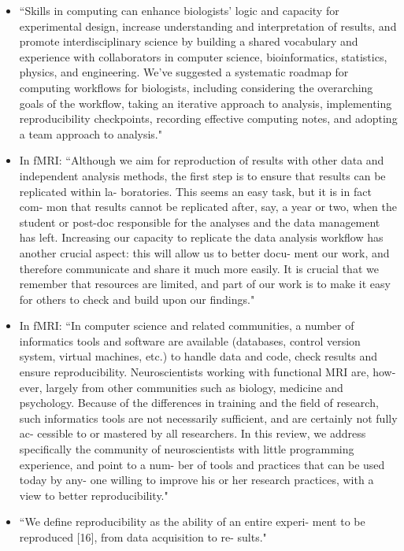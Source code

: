\documentclass[pdftex,english,11pt,parskip=half]{scrartcl}
\begin{document}
\begin{itemize}
\item ``Skills in computing can enhance biologists’ logic and capacity for experimental design, increase understanding and interpretation of results, and promote interdisciplinary science by building a shared vocabulary and experience with collaborators in computer science, bioinformatics, statistics, physics, and engineering. We’ve suggested a systematic roadmap for computing workflows for biologists, including considering the overarching goals of the workflow, taking an iterative approach to analysis, implementing reproducibility checkpoints, recording effective computing notes, and adopting a team approach to analysis." \cite{shade2015computing}
\item In fMRI: ``Although we aim for reproduction of results with other data and independent analysis methods, the first step is to ensure that results can be replicated within la- boratories. This seems an easy task, but it is in fact com- mon that results cannot be replicated after, say, a year or two, when the student or post-doc responsible for the analyses and the data management has left. Increasing our capacity to replicate the data analysis workflow has another crucial aspect: this will allow us to better docu- ment our work, and therefore communicate and share it much more easily. It is crucial that we remember that resources are limited, and part of our work is to make it easy for others to check and build upon our findings." \cite{pernet2015improving}
\item In fMRI: ``In computer science and related communities, a number of informatics tools and software are available (databases, control version system, virtual machines, etc.) to handle data and code, check results and ensure reproducibility. Neuroscientists working with functional MRI are, how- ever, largely from other communities such as biology, medicine and psychology. Because of the differences in training and the field of research, such informatics tools are not necessarily sufficient, and are certainly not fully ac- cessible to or mastered by all researchers. In this review, we address specifically the community of neuroscientists with little programming experience, and point to a num- ber of tools and practices that can be used today by any- one willing to improve his or her research practices, with a view to better reproducibility." \cite{pernet2015improving}
\item ``We define reproducibility as the ability of an entire experi- ment to be reproduced [16], from data acquisition to re- sults." \cite{pernet2015improving}

\end{itemize}
\end{document}
